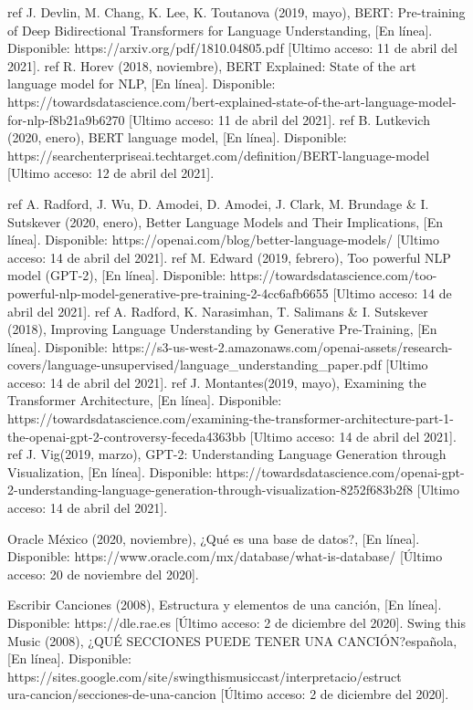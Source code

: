 \documentclass[12pt, a4paper, titlepage]{report}
\begin{document}
\begin{thebibliography}{20}
	ref J. Devlin, M. Chang, K. Lee, K. Toutanova (2019, mayo), BERT: Pre-training of Deep Bidirectional Transformers for
	Language Understanding, [En línea]. Disponible: https://arxiv.org/pdf/1810.04805.pdf [Ultimo acceso: 11 de abril del 2021].
	ref R. Horev (2018, noviembre), BERT Explained: State of the art language model for NLP, [En línea]. Disponible: https://towardsdatascience.com/bert-explained-state-of-the-art-language-model-for-nlp-f8b21a9b6270 [Ultimo acceso: 11 de abril del 2021].
	ref B. Lutkevich (2020, enero), BERT language model, [En línea]. Disponible: https://searchenterpriseai.techtarget.com/definition/BERT-language-model [Ultimo acceso: 12 de abril del 2021].
	
	ref A. Radford, J. Wu, D. Amodei, D. Amodei, J. Clark, M. Brundage \& I. Sutskever (2020, enero), Better Language Models and Their Implications, [En línea]. Disponible: https://openai.com/blog/better-language-models/ [Ultimo acceso: 14 de abril del 2021].
	ref M. Edward (2019, febrero), Too powerful NLP model (GPT-2), [En línea]. Disponible:  https://towardsdatascience.com/too-powerful-nlp-model-generative-pre-training-2-4cc6afb6655 [Ultimo acceso: 14 de abril del 2021].
	ref A. Radford, K. Narasimhan, T. Salimans \& I. Sutskever (2018), Improving Language Understanding by Generative Pre-Training, [En línea]. Disponible:  https://s3-us-west-2.amazonaws.com/openai-assets/research-covers/language-unsupervised/language\_understanding\_paper.pdf  [Ultimo acceso: 14 de abril del 2021].
	ref J. Montantes(2019, mayo), Examining the Transformer Architecture, [En línea]. Disponible: https://towardsdatascience.com/examining-the-transformer-architecture-part-1-the-openai-gpt-2-controversy-feceda4363bb  [Ultimo acceso: 14 de abril del 2021].
	ref J. Vig(2019, marzo), GPT-2: Understanding Language Generation through Visualization, [En línea]. Disponible: https://towardsdatascience.com/openai-gpt-2-understanding-language-generation-through-visualization-8252f683b2f8   [Ultimo acceso: 14 de abril del 2021].
	
	Oracle México (2020, noviembre), ¿Qué es una base de datos?, [En línea]. Disponible: https://www.oracle.com/mx/database/what-is-database/ [Último acceso: 20 de noviembre del 2020].

	Escribir Canciones (2008), Estructura y elementos de una canción, [En línea]. Disponible: https://dle.rae.es [Último acceso: 2 de diciembre del 2020].
	Swing this Music (2008), ¿QUÉ SECCIONES PUEDE TENER UNA CANCIÓN?española, [En línea]. Disponible: https://sites.google.com/site/swingthismusiccast/interpretacio/estruct\\ura-cancion/secciones-de-una-cancion [Último acceso: 2 de diciembre del 2020].
	

\end{thebibliography}
\end{document}

